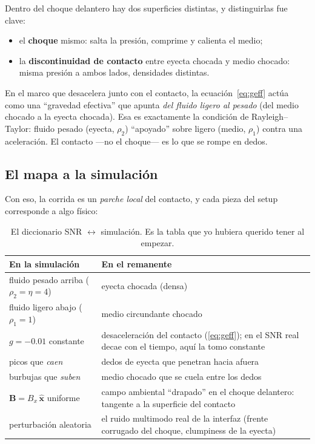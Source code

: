 \documentclass[11pt,a4paper]{article}
\begin{document}
Dentro del choque delantero hay dos superficies distintas, y distinguirlas fue clave:
\begin{itemize}[nosep]
  \item el \textbf{choque} mismo: salta la presión, comprime y calienta el medio;
  \item la \textbf{discontinuidad de contacto} entre eyecta chocada y medio chocado:
  misma presión a ambos lados, densidades distintas.
\end{itemize}
En el marco que desacelera junto con el contacto, la ecuación~\eqref{eq:geff} actúa como
una ``gravedad efectiva'' que apunta \emph{del fluido ligero al pesado} (del medio chocado
a la eyecta chocada). Esa es exactamente la condición de Rayleigh--Taylor: fluido pesado
(eyecta, $\rho_2$) ``apoyado'' sobre ligero (medio, $\rho_1$) contra una aceleración. El
contacto ---no el choque--- es lo que se rompe en dedos.

\subsection{El mapa a la simulación}

Con eso, la corrida es un \emph{parche local} del contacto, y cada pieza del setup
corresponde a algo físico:

\begin{table}[H]
\centering\small
\caption{El diccionario SNR $\leftrightarrow$ simulación. Es la tabla que yo hubiera
querido tener al empezar.}
\begin{tabular}{@{}p{5.4cm}p{9.9cm}@{}}
\toprule
En la simulación & En el remanente \\
\midrule
fluido pesado arriba ($\rho_2=\eta=4$) & eyecta chocada (densa) \\
fluido ligero abajo ($\rho_1=1$) & medio circundante chocado \\
$g=-0.01$ constante & desaceleración del contacto (\ref{eq:geff}); en el SNR real decae
con el tiempo, aquí la tomo constante \\
picos que \emph{caen} & dedos de eyecta que penetran hacia afuera \\
burbujas que \emph{suben} & medio chocado que se cuela entre los dedos \\
$\mathbf{B}=B_x\,\hat{\mathbf{x}}$ uniforme & campo ambiental ``drapado'' en el choque
delantero: tangente a la superficie del contacto \\
perturbación aleatoria & el ruido multimodo real de la interfaz (frente corrugado del
choque, clumpiness de la eyecta) \\
\bottomrule
\end{tabular}
\end{table}
\end{document}
